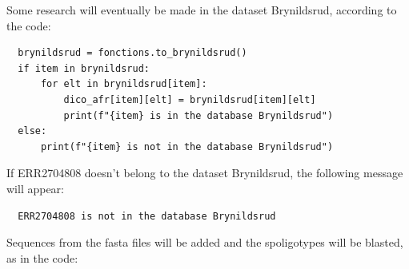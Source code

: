 \documentclass[twoside,a4paper,11pt,frenchb,openany]{report}
\begin{document}
    Some research will eventually be made in the dataset Brynildsrud,
according to the code:

\begin{verbatim}
  brynildsrud = fonctions.to_brynildsrud()
  if item in brynildsrud:
      for elt in brynildsrud[item]:
          dico_afr[item][elt] = brynildsrud[item][elt]
          print(f"{item} is in the database Brynildsrud")
  else:
      print(f"{item} is not in the database Brynildsrud")
\end{verbatim}

    If ERR2704808 doesn't belong to the dataset Brynildsrud, the following
message will appear:

    \begin{verbatim}
  ERR2704808 is not in the database Brynildsrud
\end{verbatim}

    Sequences from the fasta files will be added and the spoligotypes will
be blasted, as in the code:
\end{document}
